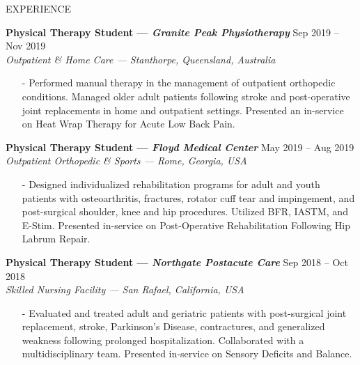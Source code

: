 \documentclass{resume} %
\begin{document}
\begin{rSection}{EXPERIENCE}
\begin{itemize}
\end{itemize}

\textbf{Physical Therapy Student --- \textit{Granite Peak Physiotherapy}} 
\hfill Sep 2019 -- Nov 2019\\
\textit{Outpatient \& Home Care --- Stanthorpe, Queensland, Australia}
\vspace*{-0.2cm}\begin{itemize}
    \item[-] Performed manual therapy in the management of outpatient orthopedic conditions. Managed older adult patients following stroke and post-operative joint replacements in home and outpatient settings. Presented an in-service on Heat Wrap Therapy for Acute Low Back Pain.
\end{itemize}

\textbf{Physical Therapy Student --- \textit{Floyd Medical Center}} \hfill May 2019 -- Aug 2019 \\
\textit{Outpatient Orthopedic \& Sports --- Rome, Georgia, USA}
\vspace*{-0.2cm}\begin{itemize}
    \item[-] Designed individualized rehabilitation programs for adult and youth patients with osteoarthritis, fractures, rotator cuff tear and impingement, and post-surgical shoulder, knee and hip procedures. Utilized BFR, IASTM, and E-Stim. Presented in-service on Post-Operative Rehabilitation Following Hip Labrum Repair.
\end{itemize}

\textbf{Physical Therapy Student --- \textit{Northgate Postacute Care}} \hfill Sep 2018 -- Oct 2018\\
\textit{Skilled Nursing Facility --- San Rafael, California, USA}
\vspace*{-0.2cm}\begin{itemize}
    \item[-] Evaluated and treated adult and geriatric patients with post-surgical joint replacement, stroke, Parkinson's Disease, contractures, and generalized weakness following prolonged hospitalization. Collaborated with a multidisciplinary team. Presented in-service on Sensory Deficits and Balance.
\end{itemize}


\end{rSection}
\end{document}
